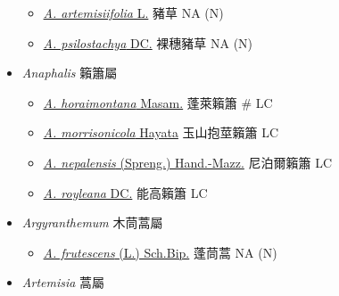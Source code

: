\begin{itemize}
  \begin{itemize}
        \item[] \href{http://www.theplantlist.org/tpl1.1/search?q=Ambrosia+artemisiifolia}{\textit{A. artemisiifolia} L.}   豬草   NA (N)
        \item[] \href{http://www.theplantlist.org/tpl1.1/search?q=Ambrosia+psilostachya}{\textit{A. psilostachya} DC.}   裸穗豬草   NA (N)
  \end{itemize}
 \item[] \textit{Anaphalis} 籟簫屬
                                
  \begin{itemize}
        \item[] \href{http://www.theplantlist.org/tpl1.1/search?q=Anaphalis+horaimontana}{\textit{A. horaimontana} Masam.}   蓬萊籟簫  \# LC
        \item[] \href{http://www.theplantlist.org/tpl1.1/search?q=Anaphalis+morrisonicola}{\textit{A. morrisonicola} Hayata}   玉山抱莖籟簫   LC
        \item[] \href{http://www.theplantlist.org/tpl1.1/search?q=Anaphalis+nepalensis}{\textit{A. nepalensis} (Spreng.) Hand.-Mazz.}   尼泊爾籟簫   LC
        \item[] \href{http://www.theplantlist.org/tpl1.1/search?q=Anaphalis+royleana}{\textit{A. royleana} DC.}   能高籟簫   LC
  \end{itemize}
 \item[] \textit{Argyranthemum} 木茼蒿屬
                                
  \begin{itemize}
        \item[] \href{http://www.theplantlist.org/tpl1.1/search?q=Argyranthemum+frutescens}{\textit{A. frutescens} (L.) Sch.Bip.}   蓬茼蒿   NA (N)
  \end{itemize}
 \item[] \textit{Artemisia} 蒿屬
                                

\end{itemize}
